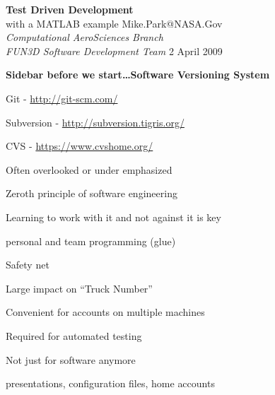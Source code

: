 \documentclass[landscape]{slides}
\renewcommand{\title}[1]{{\large\bfseries #1}}
\newenvironment{itemiz}%
  {\begin{list}{}{\raggedright
      \setlength{\itemsep}{2pt}%
      \setlength{\parskip}{4pt}\setlength{\parsep}{2pt}}}%
  {\end{list}}%
\begin{document}
\raggedright

  \begin{titlepage}
    \thispagestyle{empty}
     {\bfseries\Large Test Driven Development}\\ with a MATLAB example
     \vfill
	 {\large Mike.Park@NASA.Gov} \\
	 {\itshape Computational AeroSciences Branch} \\
	 {\itshape FUN3D Software Development Team}
	 \vfill
	     { 2 April 2009}\\
  \end{titlepage}

 \begin{slide}
  \title{Sidebar before we start\ldots Software Versioning System}
  \begin{itemiz}
    \item Git - \url{http://git-scm.com/}
    \item Subversion - \url{http://subversion.tigris.org/}
    \item CVS - \url{https://www.cvshome.org/}
    \item Often overlooked or under emphasized
    \item Zeroth principle of software engineering
    \item Learning to work with it and not against it is key 
      \begin{itemiz} 
      \item personal and team programming (glue)
      \end{itemiz}
    \item Safety net
    \item Large impact on ``Truck Number''
    \item Convenient for accounts on multiple machines
    \item Required for automated testing
    \item Not just for software anymore
      \begin{itemiz} 
      \item presentations, configuration files, home accounts
      \end{itemiz}
  \end{itemiz}
 \end{slide}
 
\end{document}
